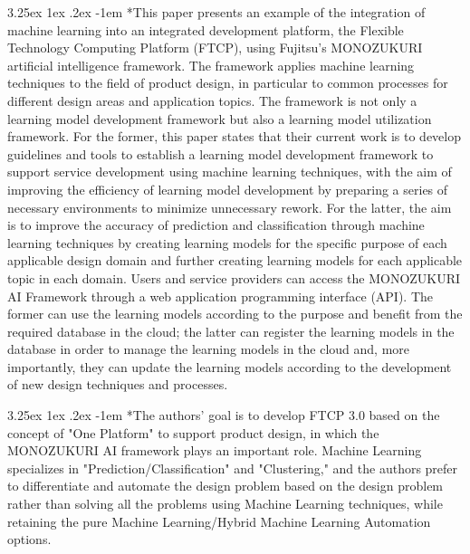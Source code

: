 \documentclass{article}
\makeatletter
\renewcommand\paragraph{\@startsection{paragraph}{4}{\z@}%
	{3.25ex \@plus1ex \@minus.2ex}%
	{-1em}%
	{\normalfont\normalsize}}
\makeatother
\begin{document}
	\paragraph*{This paper presents an example of the integration of machine learning into an integrated development platform, the Flexible Technology Computing Platform (FTCP), using Fujitsu's MONOZUKURI artificial intelligence framework. The framework applies machine learning techniques to the field of product design, in particular to common processes for different design areas and application topics. The framework is not only a learning model development framework but also a learning model utilization framework. For the former, this paper states that their current work is to develop guidelines and tools to establish a learning model development framework to support service development using machine learning techniques, with the aim of improving the efficiency of learning model development by preparing a series of necessary environments to minimize unnecessary rework. For the latter, the aim is to improve the accuracy of prediction and classification through machine learning techniques by creating learning models for the specific purpose of each applicable design domain and further creating learning models for each applicable topic in each domain. Users and service providers can access the MONOZUKURI AI Framework through a web application programming interface (API). The former can use the learning models according to the purpose and benefit from the required database in the cloud; the latter can register the learning models in the database in order to manage the learning models in the cloud and, more importantly, they can update the learning models according to the development of new design techniques and processes.}
	
	\paragraph*{The authors' goal is to develop FTCP 3.0 based on the concept of "One Platform" to support product design, in which the MONOZUKURI AI framework plays an important role. Machine Learning specializes in "Prediction/Classification" and "Clustering," and the authors prefer to differentiate and automate the design problem based on the design problem rather than solving all the problems using Machine Learning techniques, while retaining the pure Machine Learning/Hybrid Machine Learning Automation options.}
	
	\newpage
	
\end{document}
